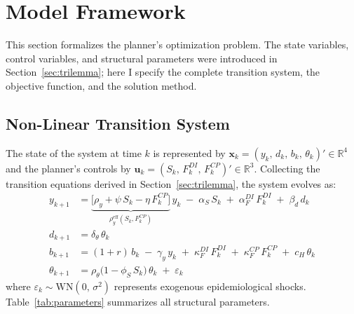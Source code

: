 
\section{Model Framework}
\label{sec:model}

This section formalizes the planner's optimization problem. The state variables,
control variables, and structural parameters were introduced in
Section~\ref{sec:trilemma}; here I specify the complete transition system, the
objective function, and the solution method.

\subsection{Non-Linear Transition System}
\label{sec:nonlinear}

The state of the system at time $k$ is represented by
$\bm{x}_k = (y_k,\, d_k,\, b_k,\, \theta_k)' \in \mathbb{R}^4$ and the planner's
controls by $\bm{u}_k = (S_k,\, F_k^{DI},\, F_k^{CP})' \in \mathbb{R}^3$.
Collecting the transition equations derived in Section~\ref{sec:trilemma}, the system
evolves as:
%
\begin{align}
    y_{k+1} &= \underbrace{\bigl[\rho_y + \psi\, S_k
    - \eta\, F_k^{CP}\bigr]}_{\rho_y^{\text{eff}}(S_k, F_k^{CP})}\, y_k
    \;-\; \alpha_S\, S_k \;+\; \alpha_F^{DI}\, F_k^{DI}
    \;+\; \beta_d\, d_k
    \label{eq:y_nonlin} \\[1ex]
    d_{k+1} &= \delta_\theta\, \theta_k
    \label{eq:d_nonlin} \\[1ex]
    b_{k+1} &= (1+r)\, b_k \;-\; \gamma_y\, y_k
    \;+\; \kappa_F^{DI}\, F_k^{DI} \;+\; \kappa_F^{CP}\, F_k^{CP}
    \;+\; c_H\, \theta_k
    \label{eq:b_nonlin} \\[1ex]
    \theta_{k+1} &= \rho_\theta\bigl(1 - \phi_S\, S_k\bigr)\,\theta_k
    \;+\; \varepsilon_k
    \label{eq:theta_nonlin}
\end{align}
%
where $\varepsilon_k \sim \text{WN}(0,\, \sigma^2)$ represents exogenous
epidemiological shocks. Table~\ref{tab:parameters} summarizes all structural
parameters.

